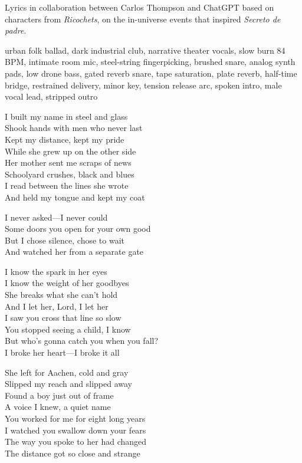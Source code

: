 
\begin{notes}
Lyrics in collaboration between Carlos Thompson and ChatGPT based on characters from \emph{Ricochets}, on the in-universe events that inspired \emph{Secreto de padre}.
\end{notes}
\begin{style}
urban folk ballad, dark industrial club, narrative theater vocals, slow burn 84 BPM, intimate room mic, steel-string fingerpicking, brushed snare, analog synth pads, low drone bass, gated reverb snare, tape saturation, plate reverb, half-time bridge, restrained delivery, minor key, tension release arc, spoken intro, male vocal lead, stripped outro
\end{style}
\begin{lyrics}
I built my name in steel and glass\\  
Shook hands with men who never last\\  
Kept my distance, kept my pride\\  
While she grew up on the other side\\  
Her mother sent me scraps of news\\  
Schoolyard crushes, black and blues\\  
I read between the lines she wrote\\  
And held my tongue and kept my coat  

I never asked—I never could\\  
Some doors you open for your own good\\  
But I chose silence, chose to wait\\  
And watched her from a separate gate  

I know the spark in her eyes\\  
I know the weight of her goodbyes\\  
She breaks what she can't hold\\  
And I let her, Lord, I let her\\  
I saw you cross that line so slow\\  
You stopped seeing a child, I know\\  
But who's gonna catch you when you fall?\\  
I broke her heart—I broke it all  

She left for Aachen, cold and gray\\  
Slipped my reach and slipped away\\  
Found a boy just out of frame\\  
A voice I knew, a quiet name\\  
You worked for me for eight long years\\  
I watched you swallow down your fears\\  
The way you spoke to her had changed\\  
The distance got so close and strange  


\end{lyrics}
